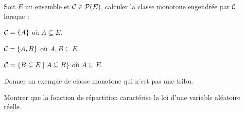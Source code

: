 \documentclass[french]{report}
\begin{document}
\begin{exo}
    Soit \(E\) un ensemble et \(\CC\in\pow[E]\), calculer la classe monotone
    engendrée par \(\CC\) lorsque :
    \begin{q}{1}
        \(\CC=\{A\}\) où \(A\subseteq E\).
    \end{q}
    \begin{q}{2}
        \(\CC=\{A,B\}\) où \(A,B\subseteq E\).
    \end{q}
    \begin{q}{3}
        \(\CC=\{B\subseteq E\mid A\subseteq B\}\) où \(A\subseteq E\).
    \end{q}
    Donner un exemple de classe monotone qui n'est pas une tribu.
\end{exo}

\begin{exo}
    Montrer que la fonction de répartition caractérise la loi d'une variable aléatoire
    réelle.
\end{exo}
\end{document}
